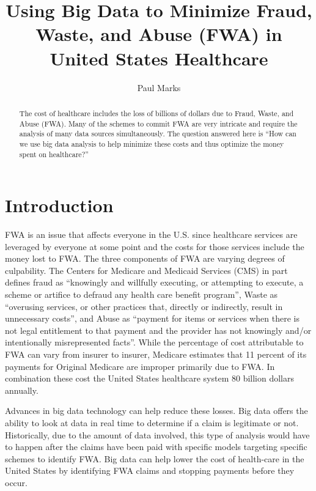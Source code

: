 \documentclass[sigconf]{acmart}
\begin{document}
\title{Using Big Data to Minimize Fraud, Waste, and Abuse (FWA) in United States Healthcare}


\author{Paul Marks}


\begin{abstract}
The cost of healthcare includes the loss of billions of dollars due to Fraud, 
Waste, and Abuse (FWA).  Many of the schemes to commit FWA are very intricate and 
require the analysis of many data sources simultaneously.  The question answered 
here is ``How can we use big data analysis to help minimize these costs and thus 
optimize the money spent on healthcare?''
\end{abstract}



\maketitle

\section{Introduction}

FWA is an issue that affects everyone in the U.S. since healthcare services are 
leveraged by everyone at some point and the costs for those services include the 
money lost to FWA.  The three components of FWA are varying degrees of 
culpability.  The Centers for Medicare and Medicaid Services (CMS) in part defines 
fraud as ``knowingly and willfully executing, or attempting to execute, a scheme or 
artifice to defraud any health care benefit program'', Waste as ``overusing services, 
or other practices that, directly or indirectly, result in unnecessary costs'', and 
Abuse as ``payment for items or services when there is not legal entitlement 
to that payment and the provider has not knowingly and/or intentionally 
misrepresented facts''.\cite{MLNFWA}  While the percentage of cost attributable to 
FWA can vary from insurer to insurer, Medicare estimates that 11 percent of its 
payments for Original Medicare are improper primarily due to FWA.\cite{FY2016HHSFR}  
In combination these cost the United States healthcare system 80 billion 
dollars\cite{HFMA} annually.  

Advances in big data technology can help reduce these losses.  Big data offers the 
ability to look at data in real time to determine if a claim is legitimate or not.  
Historically, due to the amount of data involved, this type of analysis would have to 
happen after the claims have been paid with specific models targeting specific 
schemes to identify FWA.  Big data can help lower the cost of health-care in the 
United States by identifying FWA claims and stopping payments before they occur. 
\end{document}
